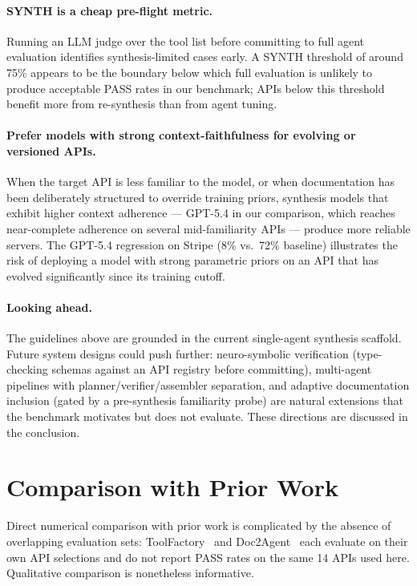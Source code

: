 \paragraph{SYNTH is a cheap pre-flight metric.}
Running an LLM judge over the tool list before committing to full agent evaluation identifies synthesis-limited cases early. A SYNTH threshold of around 75\% appears to be the boundary below which full evaluation is unlikely to produce acceptable PASS rates in our benchmark; APIs below this threshold benefit more from re-synthesis than from agent tuning.

\paragraph{Prefer models with strong context-faithfulness for evolving or versioned APIs.} When the target API is less familiar to the model, or when documentation has been deliberately structured to override training priors, synthesis models that exhibit higher context adherence --- GPT-5.4 in our comparison, which reaches near-complete adherence on several mid-familiarity APIs --- produce more reliable servers. The GPT-5.4 regression on Stripe (8\% vs.\ 72\% baseline) illustrates the risk of deploying a model with strong parametric priors on an API that has evolved significantly since its training cutoff.

\paragraph{Looking ahead.} The guidelines above are grounded in the current single-agent synthesis scaffold. Future system designs could push further: neuro-symbolic verification (type-checking schemas against an API registry before committing), multi-agent pipelines with planner/verifier/assembler separation, and adaptive documentation inclusion (gated by a pre-synthesis familiarity probe) are natural extensions that the benchmark motivates but does not evaluate. These directions are discussed in the conclusion.

\section{Comparison with Prior Work}
\label{sec:discussion-priorwork}

Direct numerical comparison with prior work is complicated by the absence of overlapping evaluation sets: ToolFactory~\citep{toolfactory2025} and Doc2Agent~\citep{doc2agent2025} each evaluate on their own API selections and do not report PASS rates on the same 14 APIs used here. Qualitative comparison is nonetheless informative.

